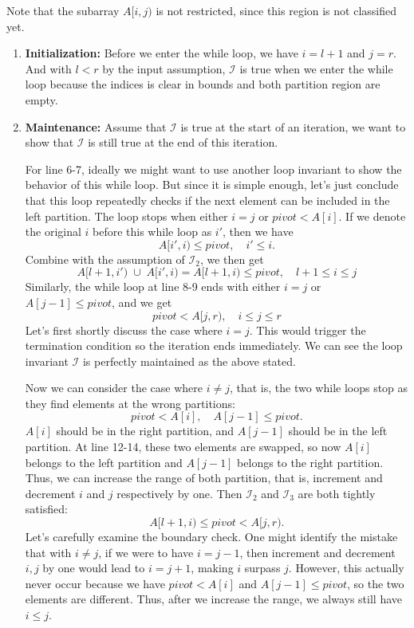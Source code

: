 \documentclass[12pt]{article}
\begin{document}
Note that the subarray \(A[i, j)\) is not restricted, since this region is not classified yet.

\begin{enumerate}
    \item \textbf{Initialization:} Before we enter the while loop, we have \(i = l + 1\) and \(j = r\). And with \(l < r\) by the input assumption, \(\mathcal{I}\) is true when we enter the while loop because the indices is clear in bounds and both partition region are empty.
    \item \textbf{Maintenance:} Assume that \(\mathcal{I}\) is true at the start of an iteration, we want to show that \(\mathcal{I}\) is still true at the end of this iteration.
    
    For line 6-7, ideally we might want to use another loop invariant to show the behavior of this while loop. But since it is simple enough, let's just conclude that this loop repeatedly checks if the next element can be included in the left partition. The loop stops when either \(i = j\) or \(pivot < A[i]\). If we denote the original \(i\) before this while loop as \(i'\), then we have
    \[
        A[i', i) \leq pivot, \quad i' \leq i.
    \]
    Combine with the assumption of \(\mathcal{I}_2\), we then get
    \[
        A[l + 1, i') \; \cup \; A[i', i) = A[l + 1, i) \leq pivot, \quad l + 1 \leq i \leq j
    \]
    Similarly, the while loop at line 8-9 ends with either \(i = j\) or \(A[j - 1] \leq pivot\), and we get
    \[
        pivot < A[j, r), \quad i \leq j \leq r
    \]
    Let's first shortly discuss the case where \(i = j\). This would trigger the termination condition so the iteration ends immediately. We can see the loop invariant \(\mathcal{I}\) is perfectly maintained as the above stated.
    
    Now we can consider the case where \(i \neq j\), that is, the two while loops stop as they find elements at the wrong partitions:
    \[
        pivot < A[i], \quad A[j - 1] \leq pivot.
    \]
    \(A[i]\) should be in the right partition, and \(A[j - 1]\) should be in the left partition. At line 12-14, these two elements are swapped, so now \(A[i]\) belongs to the left partition and \(A[j - 1]\) belongs to the right partition. Thus, we can increase the range of both partition, that is, increment and decrement \(i\) and \(j\) respectively by one. Then \(\mathcal{I}_2\) and \(\mathcal{I}_3\) are both tightly satisfied:
    \[
        A[l + 1, i) \leq pivot < A[j, r).
    \]
    Let's carefully examine the boundary check. One might identify the mistake that with \(i \neq j\), if we were to have \(i = j - 1\), then increment and decrement \(i, j\) by one would lead to \(i = j + 1\), making \(i\) surpass \(j\). However, this actually never occur because we have \(pivot < A[i]\) and \(A[j - 1] \leq pivot\), so the two elements are different. Thus, after we increase the range, we always still have \(i \leq j\).
    

\end{enumerate}
\end{document}
